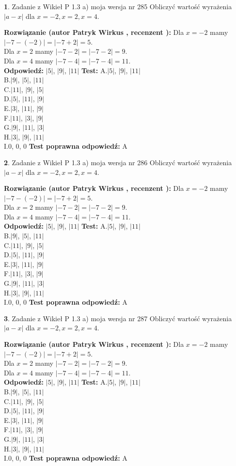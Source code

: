 \documentclass[12pt, a4paper]{article}
\theoremstyle{definition} %
\newtheorem{zad}{}
\newcommand{\zadStart}[1]{\begin{zad}#1\newline}
\newcommand{\zadStop}{\end{zad}}
\newcommand{\rozwStart}[2]{\noindent \textbf{Rozwiązanie (autor #1 , recenzent #2): }\newline}
\newcommand{\rozwStop}{\newline}
\newcommand{\odpStart}{\noindent \textbf{Odpowiedź:}\newline}
\newcommand{\odpStop}{\newline}
\newcommand{\testStart}{\noindent \textbf{Test:}\newline}
\newcommand{\testStop}{\newline}
\newcommand{\kluczStart}{\noindent \textbf{Test poprawna odpowiedź:}\newline}
\newcommand{\kluczStop}{\newline}
\begin{document}
\zadStart{Zadanie z Wikieł P 1.3 a) moja wersja nr 285}
Obliczyć wartość wyrażenia $|a - x|$ dla $x=-2,x=2,x=4$.
\zadStop
\rozwStart{Patryk Wirkus}{}
Dla $x = -2$ mamy $|-7 - (-2)| = |-7 + 2| = 5$.\\
Dla $x = 2$ mamy $|-7 - 2| = |-7 - 2| = 9$.\\
Dla $x = 4$ mamy $|-7 - 4| = |-7 - 4| = 11$.\\
\rozwStop
\odpStart
$|5|$, $|9|$, $|11|$
\odpStop
\testStart
A.$|5|$, $|9|$, $|11|$\\
B.$|9|$, $|5|$, $|11|$\\
C.$|11|$, $|9|$, $|5|$\\
D.$|5|$, $|11|$, $|9|$\\
E.$|3|$, $|11|$, $|9|$\\
F.$|11|$, $|3|$, $|9|$\\
G.$|9|$, $|11|$, $|3|$\\
H.$|3|$, $|9|$, $|11|$\\
I.$0$, $0$, $0$
\testStop
\kluczStart
A
\kluczStop



\zadStart{Zadanie z Wikieł P 1.3 a) moja wersja nr 286}
Obliczyć wartość wyrażenia $|a - x|$ dla $x=-2,x=2,x=4$.
\zadStop
\rozwStart{Patryk Wirkus}{}
Dla $x = -2$ mamy $|-7 - (-2)| = |-7 + 2| = 5$.\\
Dla $x = 2$ mamy $|-7 - 2| = |-7 - 2| = 9$.\\
Dla $x = 4$ mamy $|-7 - 4| = |-7 - 4| = 11$.\\
\rozwStop
\odpStart
$|5|$, $|9|$, $|11|$
\odpStop
\testStart
A.$|5|$, $|9|$, $|11|$\\
B.$|9|$, $|5|$, $|11|$\\
C.$|11|$, $|9|$, $|5|$\\
D.$|5|$, $|11|$, $|9|$\\
E.$|3|$, $|11|$, $|9|$\\
F.$|11|$, $|3|$, $|9|$\\
G.$|9|$, $|11|$, $|3|$\\
H.$|3|$, $|9|$, $|11|$\\
I.$0$, $0$, $0$
\testStop
\kluczStart
A
\kluczStop



\zadStart{Zadanie z Wikieł P 1.3 a) moja wersja nr 287}
Obliczyć wartość wyrażenia $|a - x|$ dla $x=-2,x=2,x=4$.
\zadStop
\rozwStart{Patryk Wirkus}{}
Dla $x = -2$ mamy $|-7 - (-2)| = |-7 + 2| = 5$.\\
Dla $x = 2$ mamy $|-7 - 2| = |-7 - 2| = 9$.\\
Dla $x = 4$ mamy $|-7 - 4| = |-7 - 4| = 11$.\\
\rozwStop
\odpStart
$|5|$, $|9|$, $|11|$
\odpStop
\testStart
A.$|5|$, $|9|$, $|11|$\\
B.$|9|$, $|5|$, $|11|$\\
C.$|11|$, $|9|$, $|5|$\\
D.$|5|$, $|11|$, $|9|$\\
E.$|3|$, $|11|$, $|9|$\\
F.$|11|$, $|3|$, $|9|$\\
G.$|9|$, $|11|$, $|3|$\\
H.$|3|$, $|9|$, $|11|$\\
I.$0$, $0$, $0$
\testStop
\kluczStart
A
\kluczStop
\end{document}
